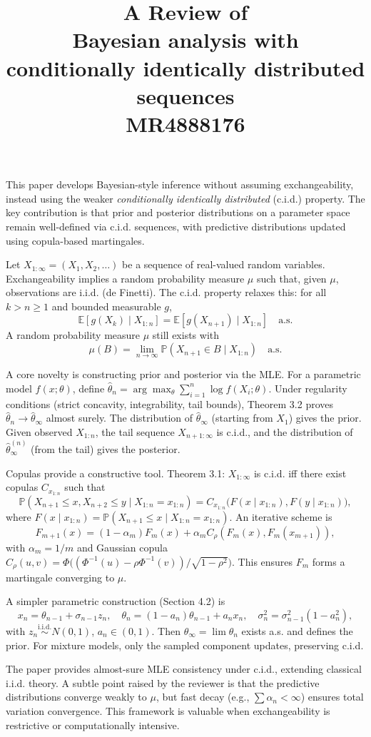 \documentclass[11pt]{article}
\title{A Review of \\Bayesian analysis with conditionally
	identically distributed sequences \\    MR4888176 }
\begin{document}
	\maketitle	



This paper develops Bayesian-style inference without assuming exchangeability, instead using the weaker \emph{conditionally identically distributed} (c.i.d.) property. The key contribution is that prior and posterior distributions on a parameter space remain well-defined via c.i.d. sequences, with predictive distributions updated using copula-based martingales.

Let $X_{1:\infty} = (X_1, X_2, \dots)$ be a sequence of real-valued random variables. Exchangeability implies a random probability measure $\mu$ such that, given $\mu$, observations are i.i.d. (de Finetti). The c.i.d. property relaxes this: for all $k > n \geq 1$ and bounded measurable $g$,
\[
\mathbb{E}[g(X_k) \mid X_{1:n}] = \mathbb{E}[g(X_{n+1}) \mid X_{1:n}] \quad \text{a.s.}
\]
A random probability measure $\mu$ still exists with
\[
\mu(B) = \lim_{n\to\infty} \mathbb{P}(X_{n+1} \in B \mid X_{1:n}) \quad \text{a.s.}
\]

A core novelty is constructing prior and posterior via the MLE. For a parametric model $f(x;\theta)$, define $\hat{\theta}_n = \arg\max_{\theta} \sum_{i=1}^n \log f(X_i;\theta)$. Under regularity conditions (strict concavity, integrability, tail bounds), Theorem 3.2 proves $\hat{\theta}_n \to \hat{\theta}_\infty$ almost surely. The distribution of $\hat{\theta}_\infty$ (starting from $X_1$) gives the prior. Given observed $X_{1:n}$, the tail sequence $X_{n+1:\infty}$ is c.i.d., and the distribution of $\hat{\theta}_\infty^{(n)}$ (from the tail) gives the posterior.

Copulas provide a constructive tool. Theorem 3.1: $X_{1:\infty}$ is c.i.d. iff there exist copulas $C_{x_{1:n}}$ such that
\[
\mathbb{P}(X_{n+1} \le x, X_{n+2} \le y \mid X_{1:n}=x_{1:n}) = C_{x_{1:n}}\big(F(x\mid x_{1:n}), F(y\mid x_{1:n})\big),
\]
where $F(x\mid x_{1:n}) = \mathbb{P}(X_{n+1} \le x \mid X_{1:n}=x_{1:n})$. An iterative scheme is
\[
F_{m+1}(x) = (1-\alpha_m)F_m(x) + \alpha_m C_\rho(F_m(x), F_m(x_{m+1})),
\]
with $\alpha_m = 1/m$ and Gaussian copula $C_\rho(u,v) = \Phi\big((\Phi^{-1}(u) - \rho\Phi^{-1}(v))/\sqrt{1-\rho^2}\big)$. This ensures $F_m$ forms a martingale converging to $\mu$.

A simpler parametric construction (Section 4.2) is
\[
x_{n} = \theta_{n-1} + \sigma_{n-1}z_n,\quad
\theta_n = (1-a_n)\theta_{n-1} + a_n x_n,\quad
\sigma_n^2 = \sigma_{n-1}^2(1-a_n^2),
\]
with $z_n \stackrel{\text{i.i.d.}}{\sim} N(0,1)$, $a_n \in (0,1)$. Then $\theta_\infty = \lim \theta_n$ exists a.s. and defines the prior. For mixture models, only the sampled component updates, preserving c.i.d.

The paper provides almost-sure MLE consistency under c.i.d., extending classical i.i.d. theory. A subtle point raised by the reviewer is that the predictive distributions converge weakly to $\mu$, but fast decay (e.g., $\sum \alpha_n < \infty$) ensures total variation convergence. This framework is valuable when exchangeability is restrictive or computationally intensive.
\end{document}
